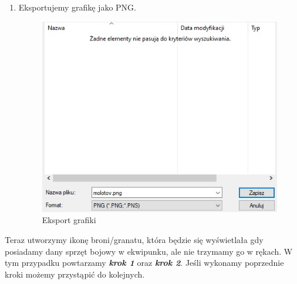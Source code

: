 \begin{enumerate}
  \item Eksportujemy grafikę jako PNG.
\begin{figure}[h]
    \centering
    \includegraphics[scale=0.7]{Images/Saving.jpg}
    \caption{Eksport grafiki}
\end{figure}
\FloatBarrier
\end{enumerate}

Teraz utworzymy ikonę broni/granatu, która będzie się wyświetlała gdy posiadamy dany sprzęt bojowy w ekwipunku, ale nie trzymamy go w rękach. W tym przypadku powtarzamy \textbf{\textit{krok 1}} oraz \textbf{\textit{krok 2}}. Jeśli wykonamy poprzednie kroki możemy przystąpić do kolejnych.

